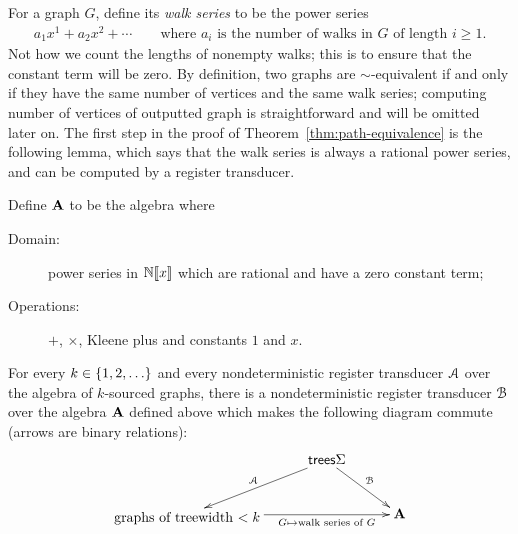 For a graph $G$, define its \emph{walk series} to be the power series 
\begin{align*}
  a_1 x^1 + a_2x^2 + \cdots \qquad \text{where $a_i$ is the number of walks in $G$ of length $i \ge 1$.}
\end{align*}
Not how we count the lengths of nonempty walks; this is to ensure that the constant term will be zero.
By definition, two graphs are $\sim$-equivalent if and only if they have the same number of vertices and the same walk series; computing number of vertices of outputted graph is straightforward and will be omitted later on. 
The first step in the proof of Theorem~\ref{thm:path-equivalence} is the following lemma, which says that the walk series is always a  rational power series, and can be computed by a register transducer.
\begin{lemma}\label{lem:compute-power-series}    
    Define  $\mathbf{A}$ to be the  algebra where
    \begin{description}
        \item[Domain:]power series in $\mathbb N [\![x]\!]$ which are rational and have a  zero constant term;
        \item[Operations:] $+$, $\times$, Kleene plus and constants $1$ and $x$.
    \end{description}
    For every $k \in \{1,2,\ldots\}$ and every nondeterministic register transducer ${{\mathcal A}}$ over the algebra of $k$-sourced graphs, there is a  nondeterministic register transducer ${\mathcal B}$ over the algebra  $\mathbf{A}$ defined above which makes the following diagram commute (arrows are binary relations):
    \begin{align*}
    \xymatrix@C=1cm{
       &  \trees \Sigma   
        \ar[dr]^{\Bb}
        \ar[dl]_{\Aa} \\
        \txt{graphs of
        treewidth $< k$} \ar[rr]_-{G \mapsto \text{walk series of $G$}}& & \aalg
    }
    \end{align*}
\end{lemma}

